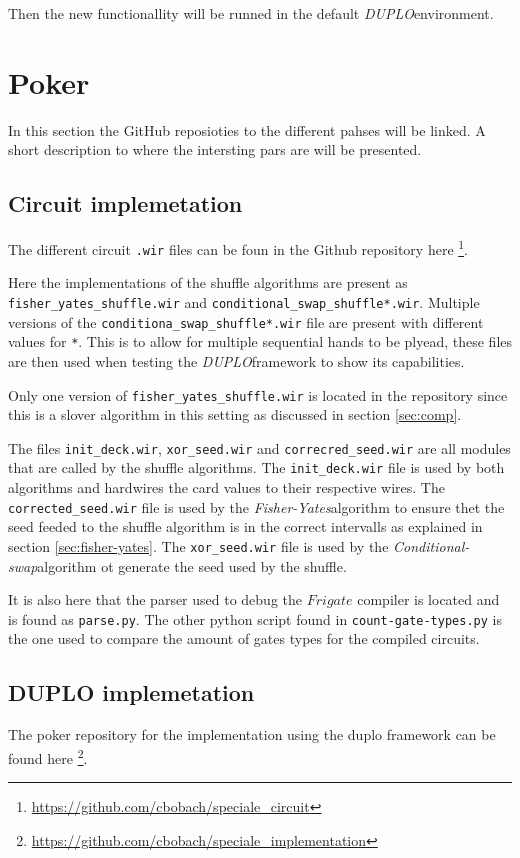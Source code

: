 \documentclass[twoside,11pt,openright]{report}
\newcommand{\FY}{\textit{Fisher-Yates}}
\newcommand{\CS}{\textit{Conditional-swap}}
\newcommand{\DUPLO}{\textit{DUPLO}}
\begin{document}
\begin{appendices}
Then the new functionallity will be runned in the default \DUPLO environment.

\section{Poker}
\label{app:poker}
In this section the GitHub reposioties to the different pahses will be linked. A short description to where the intersting pars are will be presented.

\subsection{Circuit implemetation}
\label{app:circuit-impl}
The different circuit \verb|.wir| files can be foun in the Github repository here \footnote{\url{https://github.com/cbobach/speciale_circuit}}.

Here the implementations of the shuffle algorithms are present as \verb|fisher_yates_shuffle.wir| and \verb|conditional_swap_shuffle*.wir|. Multiple versions of the \verb|conditiona_swap_shuffle*.wir| file are present with different values for \verb|*|. This is to allow for multiple sequential hands to be plyead, these files are then used when testing the \DUPLO framework to show its capabilities.

Only one version of \verb|fisher_yates_shuffle.wir| is located in the repository since this is a slover algorithm in this setting as discussed in section \ref{sec:comp}.

The files \verb|init_deck.wir|, \verb|xor_seed.wir| and \verb|correcred_seed.wir| are all modules that are called by the shuffle algorithms. The \verb|init_deck.wir| file is used by both algorithms and hardwires the card values to their respective wires. The \verb|corrected_seed.wir| file is used by the \FY algorithm to ensure thet the seed feeded to the shuffle algorithm is in the correct intervalls as explained in section \ref{sec:fisher-yates}. The \verb|xor_seed.wir| file is used by the \CS algorithm ot generate the seed used by the shuffle.

\bigskip

It is also here that the parser used to debug the $Frigate$ compiler is located and is found as \verb|parse.py|. The other python script found in \verb|count-gate-types.py| is the one used to compare the amount of gates types for the compiled circuits.


\subsection{DUPLO implemetation}
\label{app:duplo-impl}
The poker repository for the implementation using the duplo framework can be found here \footnote{\url{https://github.com/cbobach/speciale_implementation}}.


\end{appendices}
\end{document}
